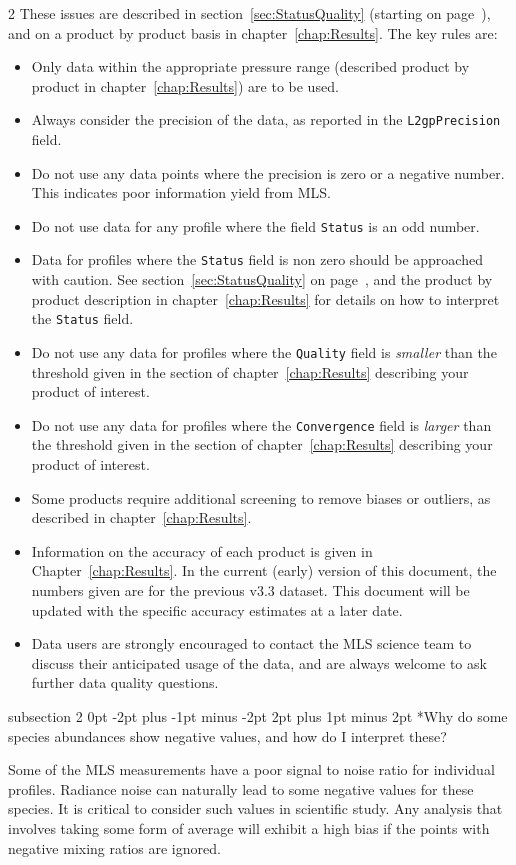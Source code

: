 \documentclass[11pt,draft]{report}
\makeatletter
\renewcommand{\subsection}{\@startsection%
  {subsection}%
  {2}%
  {0pt}%
  {-2pt plus -1pt minus -2pt}%
  {2pt plus 1pt minus 2pt}%
  {\large\sffamily\fontseries{sb}\selectfont\flushleft\color{SectionColor}\figureversion{tabular}}}%
\makeatother
\begin{document}
\begin{multicols}{2}
These issues are described in section~\ref{sec:StatusQuality} (starting
on page~\pageref{sec:StatusQuality}), and on a product by product basis
in chapter~\ref{chap:Results}.  The key rules are:
\begin{itemize}[leftmargin=2ex]
\item Only data within the appropriate pressure range (described product
  by product in chapter~\ref{chap:Results}) are to be used.
\item Always consider the precision of the data, as reported in the
  \texttt{L2gpPrecision} field.
\item Do not use any data points where the precision is zero or a
  negative number.  This indicates poor information yield from MLS.
\item Do not use data for any profile where the field \texttt{Status} is
  an odd number.
\item Data for profiles where the \texttt{Status} field is non zero
  should be approached with caution.  See
  section~\ref{sec:StatusQuality} on page~\pageref{sec:StatusQuality},
  and the product by product description in chapter~\ref{chap:Results}
  for details on how to interpret the \texttt{Status} field.
\item Do not use any data for profiles where the \texttt{Quality} field
  is \emph{smaller} than the threshold given in the section of
  chapter~\ref{chap:Results} describing your product of interest.
\item Do not use any data for profiles where the \texttt{Convergence}
  field is \emph{larger} than the threshold given in the section of
  chapter~\ref{chap:Results} describing your product of interest.
\item Some products require additional screening to remove biases or
  outliers, as described in chapter~\ref{chap:Results}.
\item Information on the accuracy of each product is given in
  Chapter~\ref{chap:Results}.  In the current (early) version of this
  document, the numbers given are for the previous v3.3 dataset.  This
  document will be updated with the specific \thisv accuracy estimates
  at a later date.
\item Data users are strongly encouraged to contact the MLS
  science team to discuss their anticipated usage of the data, and are
  always welcome to ask further data quality questions.
\end{itemize}

\subsection*{Why do some species abundances show negative values, and how do I
  interpret these?}

Some of the MLS measurements have a poor signal to noise ratio for
individual profiles.  Radiance noise can naturally lead to some negative
values for these species.  It is critical to consider such values in
scientific study.  Any analysis that involves taking some form of
average will exhibit a high bias if the points with negative mixing
ratios are ignored.

\end{multicols}
\end{document}
